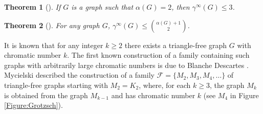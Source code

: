 \documentclass[11pt]{article}
\newtheorem{thm}{Theorem}
\begin{document}
	\begin{thm} [\cite{goddard2005eternal}] \label{Theorem:GoddardSmallest}
		If $G$ is a graph such that $\alpha(G)=2$, then $\gamma^\infty(G) \leq 3$.
	\end{thm}

	\begin{thm} [\cite{klostermeyer2007eternal}] \label{Theorem:Alpha+1}
		For any graph $G$, $\gamma^\infty(G) \leq {\alpha(G)+1 \choose 2}$.
	\end{thm}
	
	It is known that for any integer $k \geq 2$ there exists a triangle-free graph $G$ with chromatic number $k$. The first known construction of a family containing such graphs with arbitrarily large chromatic numbers is due to Blanche Descartes \cite{descartes1947three, descartes1954solution}. Mycielski \cite{mycielski1955coloriage} described the construction of a family $\mathcal{F}=\{M_2, M_3, M_4, \ldots\}$ of triangle-free graphs starting with $M_2 = K_2$, where, for each $k \geq 3$, the graph $M_k$ is obtained from the graph $M_{k-1}$ and has chromatic number $k$ (see $M_4$ in Figure \ref{Figure:Grotzsch}).
	
\end{document}
